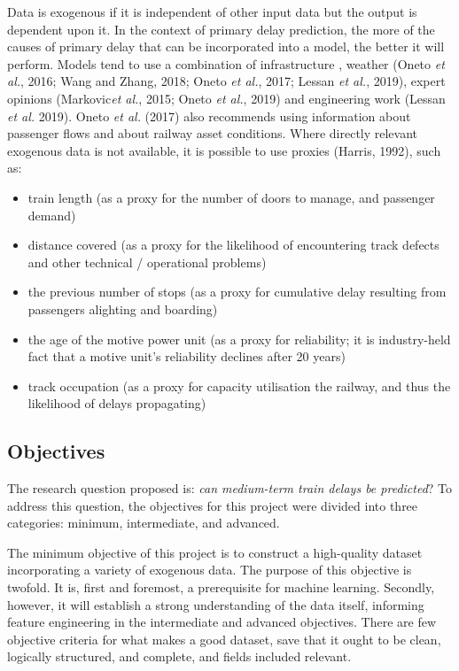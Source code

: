 \documentclass[12pt,a4paper]{article}
\begin{document}
Data is exogenous if it is independent of other input data but the output is dependent upon it. In the context of primary delay prediction, the more of the causes of primary delay that can be incorporated into a model, the better it will perform. Models tend to use a combination of infrastructure \cite{markovic_et_al_2015,milinkovic_et_al_2013,lessan_et_al_2019}, weather (Oneto \textit{et al.}, 2016; Wang and Zhang, 2018; Oneto \textit{et al.}, 2017; Lessan \textit{et al.}, 2019), expert opinions (Markovic\textit{et al.}, 2015; Oneto \textit{et al.}, 2019) and engineering work (Lessan \textit{et al.} 2019). Oneto \textit{et al.} (2017) also recommends using information about passenger flows and about railway asset conditions.  Where directly relevant exogenous data is not available, it is possible to use proxies (Harris, 1992), such as: 

\begin{itemize}
	\item{train length (as a proxy for the number of doors to manage, and passenger demand)}
	\item{distance covered (as a proxy for the likelihood of encountering track defects and other technical / operational problems)}
	\item{the previous number of stops (as a proxy for cumulative delay resulting from passengers alighting and boarding)}
	\item{the age of the motive power unit (as a proxy for reliability; it is industry-held fact that a motive unit’s reliability declines after 20 years)}
	\item{track occupation (as a proxy for capacity utilisation the railway, and thus the likelihood of delays propagating)}
\end{itemize}

\subsection{Objectives}

The research question proposed is: \textit{can medium-term train delays be predicted}? To address this question, the objectives for this project were divided into three categories: minimum, intermediate, and advanced. 

The minimum objective of this project is to construct a high-quality dataset incorporating a variety of exogenous data. The purpose of this objective is twofold. It is, first and foremost, a prerequisite for machine learning. Secondly, however, it will establish a strong understanding of the data itself, informing feature engineering in the intermediate and advanced objectives. There are few objective criteria for what makes a good dataset, save that it ought to be clean, logically structured, and complete, and fields included relevant. 
\end{document}
